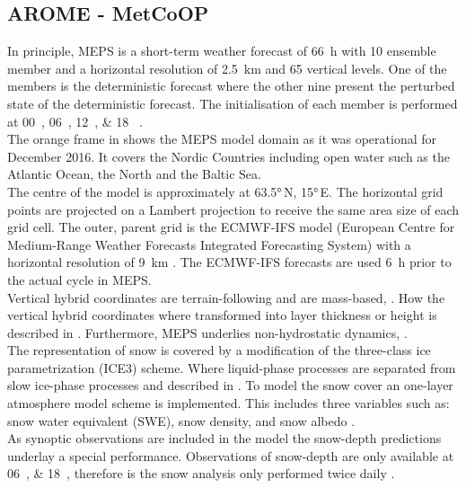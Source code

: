 \subsection{AROME - MetCoOP}
In principle, MEPS is a short-term weather forecast of \SI{66}{\hour} with 10 ensemble member and a horizontal resolution of \SI{2.5}{\km} and 65 vertical levels. One of the members is the deterministic forecast where the other nine present the perturbed state of the deterministic forecast. The initialisation of each member is performed at \SIlist{00;06;12;18}{\UTC} \citep{metcoop_wiki_description_2017}.
\\
The orange frame in  shows the MEPS model domain as it was operational for December 2016. It covers the Nordic Countries including open water such as the Atlantic Ocean, the North and the Baltic Sea.  
\\
The centre of the model is approximately at \ang{63.5}\,N, \ang{15}\,E. 
The horizontal grid points are projected on a Lambert projection to receive the same area size of each grid cell. 
The outer, parent grid is the ECMWF-IFS model (European Centre for Medium-Range Weather Forecasts Integrated Forecasting System) with a horizontal resolution of \SI{9}{\km} \citep{homleid_verification_2016}. The ECMWF-IFS forecasts are used \SI{6}{\hour} prior to the actual cycle in MEPS.
\\
Vertical hybrid coordinates are terrain-following and are mass-based, \citep{muller_arome-metcoop:_2017}. How the vertical hybrid coordinates where transformed into layer thickness or height is described in . Furthermore, MEPS underlies non-hydrostatic dynamics, \cite{metcoop_wiki_description_2017}.
\\
The representation of snow is covered by a modification of the three-class ice parametrization (ICE3) scheme. Where liquid-phase processes are separated from slow ice-phase processes and described in . To model the snow cover an one-layer atmosphere model scheme is implemented. This includes three variables such as: snow water equivalent (SWE), snow density, and snow albedo \citep{muller_arome-metcoop:_2017}.
\\
As synoptic observations are included in the model the snow-depth predictions underlay a special performance. Observations of snow-depth are only available at \SIlist{06;18}{\UTC}, therefore is the snow analysis only performed twice daily \citep{muller_arome-metcoop:_2017, homleid_verification_2016}. 
%
